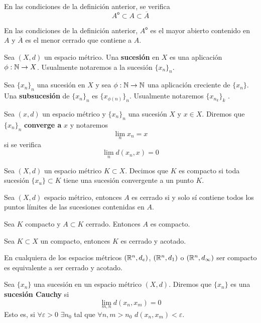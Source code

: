 \documentclass[FyPI.tex]{subfiles}
\newcommand*\interior[1]{#1^{\mathsf{o}}}
\begin{document}
\begin{prop}
En las condiciones de la definición anterior, se verifica
$$
\interior{A}\subset A \subset \overline{A}
$$
\end{prop}
\begin{ejer}
En las condiciones de la definición anterior, $\interior{A}$ es el mayor abierto contenido en $A$ y $\overline{A}$ es el menor cerrado que contiene a $A$.
\end{ejer}

\begin{defi}
Sea $(X,d)$ un espacio métrico. Una \textbf{sucesión} en $X$ es una aplicación $\phi:\mathbb{N}\to X$. Usualmente notaremos a la sucesión $\{x_n\}_n$.
\end{defi}
\begin{defi}
Sea $\{x_n\}_n$ una sucesión en $X$ y sea $\phi:\mathbb{N}\to \mathbb{N}$ una aplicación creciente de $\{x_n\}$. Una \textbf{subsucesión} de $\{x_n\}_n$ es $\{x_{\phi(n)}\}_n$. Usualmente notaremos $\{x_{n_k}\}_k$ . 
\end{defi}
\begin{defi}
Sea $(x,d)$ un espacio métrico y $\{x_n\}_n$ una sucesión $X$ y $x\in X$. Diremos que $\{x_n\}_n$ \textbf{converge a} $x$ y notaremos 
$$
\lim_n x_n = x
$$
si se verifica
$$
\lim_n d(x_n,x) = 0
$$
\end{defi}
\begin{defi} Sea $(X,d)$ un espacio métrico $K\subset X$. Decimos que $K$ es compacto si toda sucesión $\{x_u\}\subset K$ tiene una sucesión convergente a un punto $K$.
\end{defi}
\begin{ejer}
Sea $(X,d)$ espacio métrico, entonces $A$ es cerrado si y solo sí contiene todos los puntos límites de las sucesiones contenidas en $A$.
\end{ejer}
\begin{ejer}
Sea $K$ compacto y $A\subset K$ cerrado. Entonces $A$ es compacto.
\end{ejer}
\begin{ejer}
Sea $K\subset X$ un compacto, entonces $K$ es cerrado y acotado.
\end{ejer}
\begin{theorem}[Heine] En cualquiera de los espacios métricos $(\mathbb{R}^n,d_e)$, $(\mathbb{R}^n,d_1)$ o $(\mathbb{R}^n,d_\infty)$ ser compacto es equivalente a ser cerrado y acotado.
\end{theorem}
\begin{defi}
Sea $\{x_n\}$ una sucesión en un espacio métrico $(X,d)$. Diremos que $\{x_n\}$ es una \textbf{sucesión Cauchy} si 
$$
\lim_{m,n}d(x_n,x_m) = 0
$$ 
Esto es, si $\forall \varepsilon >0$ $\exists n_0$ tal que $\forall n,m>n_0$ $d(x_n,x_m)<\varepsilon$.
\end{defi}
\end{document}

